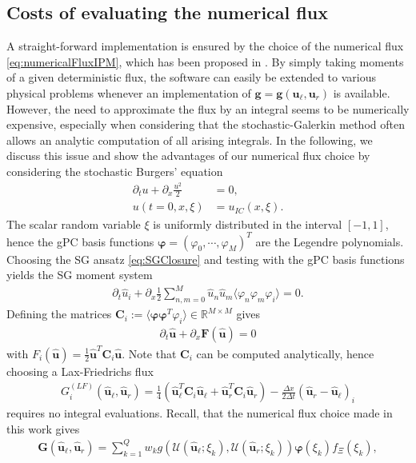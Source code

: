 \subsection{Costs of evaluating the numerical flux}
A straight-forward implementation is ensured by the choice of the numerical flux \eqref{eq:numericalFluxIPM}, which has been proposed in \cite{kusch2017maximum}. By simply taking moments of a given deterministic flux, the software can easily be extended to various physical problems whenever an implementation of $\bm g = \bm g(\bm u_\ell, \bm u_r)$ is available. However, the need to approximate the flux by an integral seems to be numerically expensive, especially when considering that the stochastic-Galerkin method often allows an analytic computation of all arising integrals. In the following, we discuss this issue and show the advantages of our numerical flux choice by considering the stochastic Burgers' equation
\begin{align*}
\partial_t u + \partial_x \frac{u^2}{2} &= 0,\\
u(t=0,x,\xi) &= u_{IC}(x,\xi).
\end{align*}
The scalar random variable $\xi$ is uniformly distributed in the interval $[-1,1]$, hence the gPC basis functions $\bm\varphi=(\varphi_0,\cdots,\varphi_M)^T$ are the Legendre polynomials. Choosing the SG ansatz \eqref{eq:SGClosure} and testing with the gPC basis functions yields the SG moment system
\begin{align*}
\partial_t \hat u_i + \partial_x \frac12\sum_{n,m = 0}^M \hat u_n \hat u_m \langle \varphi_n\varphi_m\varphi_i \rangle = 0.
\end{align*}
Defining the matrices $\bm C_i := \langle \bm\varphi\bm\varphi^T\varphi_i\rangle\in\mathbb{R}^{M\times M}$ gives
\begin{align*}
\partial_t \bm{\hat u} + \partial_x \bm F(\bm{\hat u}) = 0
\end{align*}
with $F_i(\bm{\hat u}) = \frac12\bm{\hat u}^T\bm C_i\bm{\hat u}$. Note that $\bm{C}_i$ can be computed analytically, hence choosing a Lax-Friedrichs flux
\begin{align}\label{eq:numFluxAnalytic}
G_i^{(LF)}(\bm{\hat u}_{\ell},\bm{\hat u}_{r}) =\frac{1}{4}\left(\bm{\hat u}_{\ell}^T \bm{C}_i \bm{\hat u}_{\ell}+\bm{\hat u}_{r}^T \bm{C}_i \bm{\hat u}_{r}\right) - \frac{\Delta x}{2\Delta t}(\bm{\hat u}_{r}-\bm{\hat u}_{\ell})_i
\end{align}
requires no integral evaluations. Recall, that the numerical flux choice made in this work gives
\begin{align}\label{eq:numericalFluxIPMBurgers}
 \bm{G}(\bm{\hat u}_{\ell},\bm{\hat u}_{r}) = \sum_{k=1}^Q w_k g(\mathcal{U}(\bm{\hat u}_{\ell};\xi_k),\mathcal{U}(\bm{\hat u}_{r};\xi_k))\bm{\varphi}(\xi_k)f_{\Xi}(\xi_k),
\end{align}
